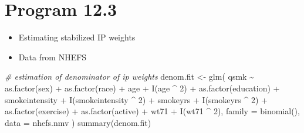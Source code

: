 \documentclass[
  10pt,
]{book}
\newenvironment{Shaded}{\begin{snugshade}}{\end{snugshade}}
\newcommand{\AttributeTok}[1]{\textcolor[rgb]{0.77,0.63,0.00}{#1}}
\newcommand{\CommentTok}[1]{\textcolor[rgb]{0.56,0.35,0.01}{\textit{#1}}}
\newcommand{\DecValTok}[1]{\textcolor[rgb]{0.00,0.00,0.81}{#1}}
\newcommand{\FunctionTok}[1]{\textcolor[rgb]{0.00,0.00,0.00}{#1}}
\newcommand{\NormalTok}[1]{#1}
\newcommand{\OtherTok}[1]{\textcolor[rgb]{0.56,0.35,0.01}{#1}}
\newcommand{\SpecialCharTok}[1]{\textcolor[rgb]{0.00,0.00,0.00}{#1}}
\providecommand{\tightlist}{%
  \setlength{\itemsep}{0pt}\setlength{\parskip}{0pt}}
\begin{document}
\hypertarget{program-12.3}{%
\section{Program 12.3}\label{program-12.3}}

\begin{itemize}
\tightlist
\item
  Estimating stabilized IP weights
\item
  Data from NHEFS
\end{itemize}

\begin{Shaded}
\begin{Highlighting}[]
\CommentTok{\# estimation of denominator of ip weights}
\NormalTok{denom.fit }\OtherTok{\textless{}{-}}
  \FunctionTok{glm}\NormalTok{(}
\NormalTok{    qsmk }\SpecialCharTok{\textasciitilde{}} \FunctionTok{as.factor}\NormalTok{(sex) }\SpecialCharTok{+} \FunctionTok{as.factor}\NormalTok{(race) }\SpecialCharTok{+}\NormalTok{ age }\SpecialCharTok{+} \FunctionTok{I}\NormalTok{(age }\SpecialCharTok{\^{}} \DecValTok{2}\NormalTok{) }\SpecialCharTok{+}
      \FunctionTok{as.factor}\NormalTok{(education) }\SpecialCharTok{+}\NormalTok{ smokeintensity }\SpecialCharTok{+}
      \FunctionTok{I}\NormalTok{(smokeintensity }\SpecialCharTok{\^{}} \DecValTok{2}\NormalTok{) }\SpecialCharTok{+}\NormalTok{ smokeyrs }\SpecialCharTok{+} \FunctionTok{I}\NormalTok{(smokeyrs }\SpecialCharTok{\^{}} \DecValTok{2}\NormalTok{) }\SpecialCharTok{+}
      \FunctionTok{as.factor}\NormalTok{(exercise) }\SpecialCharTok{+} \FunctionTok{as.factor}\NormalTok{(active) }\SpecialCharTok{+}\NormalTok{ wt71 }\SpecialCharTok{+} \FunctionTok{I}\NormalTok{(wt71 }\SpecialCharTok{\^{}} \DecValTok{2}\NormalTok{),}
    \AttributeTok{family =} \FunctionTok{binomial}\NormalTok{(),}
    \AttributeTok{data =}\NormalTok{ nhefs.nmv}
\NormalTok{  )}
\FunctionTok{summary}\NormalTok{(denom.fit)}
\end{Highlighting}
\end{Shaded}
\end{document}
